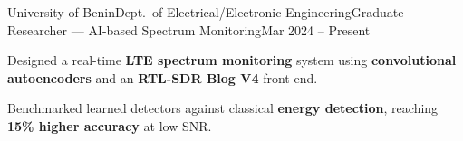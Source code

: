 \begin{cvjob}{University of Benin}{Dept.\ of Electrical/Electronic Engineering}{Graduate Researcher --- AI-based Spectrum Monitoring}{Mar 2024 -- Present}
  \item Designed a real-time \textbf{LTE spectrum monitoring} system using \textbf{convolutional autoencoders} and an \textbf{RTL-SDR Blog V4} front end.
  \item Benchmarked learned detectors against classical \textbf{energy detection}, reaching \textbf{15\% higher accuracy} at low SNR.
\end{cvjob}
